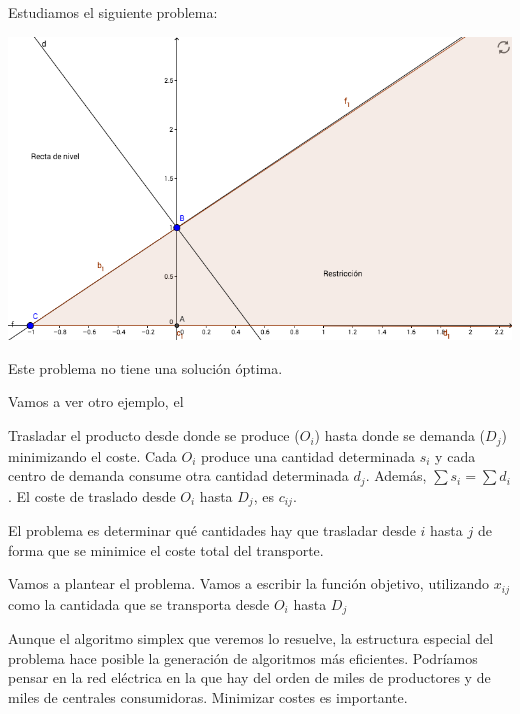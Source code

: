 \begin{example}

Estudiamos el siguiente problema:

\begin{ioprob} 
\end{ioprob}

\begin{center}
\includegraphics[scale=0.45]{img/io-intro_3.png}
\end{center}

Este problema no tiene una solución óptima.
\end{example}


Vamos a ver otro ejemplo, el 
\begin{example}
Trasladar el producto desde donde se produce ($O_i$) hasta donde se demanda ($D_j$) minimizando el coste. 
Cada $O_i$ produce una cantidad determinada $s_i$ y cada centro de demanda consume otra cantidad determinada $d_j$.
Además, $\sum s_i = \sum d_i$.
El coste de traslado desde $O_i$ hasta $D_j$, es $c_{ij}$. 

El problema es determinar qué cantidades hay que trasladar desde $i$ hasta $j$ de forma que se minimice el coste total del transporte.


Vamos a plantear el problema. Vamos a escribir la función objetivo, utilizando $x_{ij}$ como la cantidada que se transporta desde $O_i$ hasta $D_j$

\begin{ioprob}
\end{ioprob}

Aunque el algoritmo simplex que veremos lo resuelve, la estructura especial del problema hace posible la generación de algoritmos más eficientes. 
Podríamos pensar en la red eléctrica en la que hay del orden de miles de productores y de miles de centrales consumidoras. 
Minimizar costes es importante.
\end{example}

